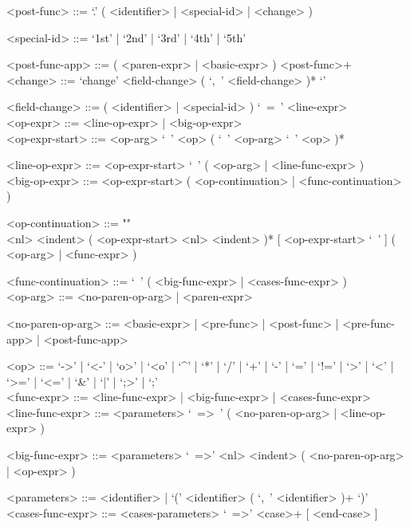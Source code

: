 \documentclass{article}
\begin{document}
\begin{grammar}
<post-func> ::= `.' ( <identifier> | <special-id> | <change> )

<special-id> ::= `1st' | `2nd' | `3rd' | `4th' | `5th'

<post-func-app> ::= ( <paren-expr> | <basic-expr> ) <post-func>+
\\

<change> ::= `change{' <field-change> ( `,\ ' <field-change> )* `}'

<field-change> ::= ( <identifier> | <special-id> ) `\ =\ ' <line-expr>
\\

<op-expr> ::= <line-op-expr> | <big-op-expr>
\\

<op-expr-start> ::= <op-arg> `\ ' <op> ( `\ ' <op-arg> `\ ' <op> )*

<line-op-expr> ::= <op-expr-start> `\ ' ( <op-arg> | <line-func-expr> )
\\

<big-op-expr> ::= 
<op-expr-start> ( <op-continuation> | <func-continuation> )

<op-continuation> ::= ""\\
<nl> <indent> ( <op-expr-start> <nl> <indent> )* 
[ <op-expr-start> `\ ' ] ( <op-arg> | <func-expr> )

<func-continuation> ::= `\ ' ( <big-func-expr> | <cases-func-expr> )
\\

<op-arg> ::= <no-paren-op-arg> | <paren-expr>

<no-paren-op-arg> ::=
<basic-expr> | <pre-func> | <post-func> | <pre-func-app> | <post-func-app>

<op> ::= 
`->' | `<-' | `o>' | `<o' | `^' | `*' | `/' | `+' | `-' |
`=' | `!=' | `>' | `<' | `>=' | `<=' | `\&' | `|' | `;>' | `;'
\\

<func-expr> ::= <line-func-expr> | <big-func-expr> | <cases-func-expr>
\\

<line-func-expr> ::=
<parameters> `\ =>\ ' ( <no-paren-op-arg> | <line-op-expr> )

<big-func-expr> ::=
<parameters> `\ =>' <nl> <indent> ( <no-paren-op-arg> | <op-expr> )

<parameters> ::= <identifier> | `(' <identifier> ( `,\ ' <identifier> )+ `)'
\\

<cases-func-expr> ::= <cases-parameters> `\ =>' <case>+ [ <end-case> ]


\end{grammar}
\end{document}
